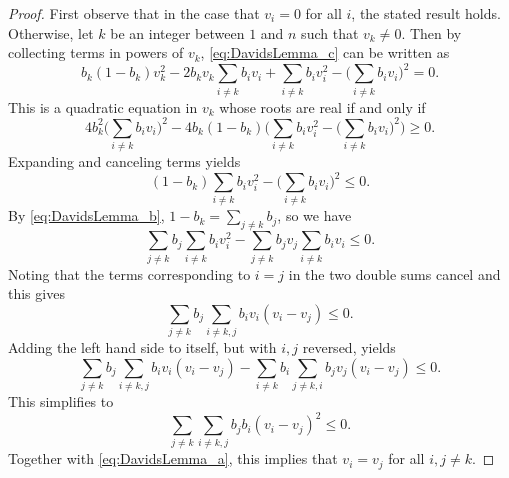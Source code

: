 \begin{proof}
    First observe that in the case that $v_i=0$ for all $i$, the stated
    result holds.  Otherwise, let $k$ be an integer between $1$ and $n$
    such that $v_k\ne 0$.
    Then by collecting terms in powers of $v_k$, \eqref{eq:DavidsLemma_c} 
    can be written as
    \begin{equation*}
    		b_k(1-b_k)v_k^2 - 2b_k v_k\sum_{i \neq k}b_i v_i + \sum_{i \neq k}b_i v_i^2 - \biggl(\sum_{i \neq k}b_i v_i\biggr)^{\!\! 2} = 0.  		
	\end{equation*}
	This is a quadratic equation in $v_k$ whose roots are real if and only if
	\begin{equation*}
    		4b_k^2\biggl(\sum_{i \neq k}b_i v_i\biggr)^{\!\! 2} - 4b_k(1-b_k)\Biggl(\sum_{i \neq k}b_i v_i^2 - \biggl(\sum_{i \neq k}b_i v_i\biggr)^{\!\! 2}\Biggr) \geq 0.
	\end{equation*}
	Expanding and canceling terms yields
	\begin{equation*}
    (1-b_k)\sum_{i \neq k}b_i v_i^2 - \biggl(\sum_{i \neq k}b_i v_i\biggr)^{\!\! 2} \leq 0.
	\end{equation*}
	By \eqref{eq:DavidsLemma_b}, $1-b_k = \sum_{j \ne k}b_j$, so we have
	\begin{equation*}
    		\sum_{j \neq k}b_j\sum_{i \neq k}b_i v_i^2 - \sum_{j \neq k}b_j v_j\sum_{i \neq k}b_i v_i \leq 0.
	\end{equation*}
	Noting that the terms corresponding to $i = j$ in the two double sums cancel and this gives
	\begin{equation*}
    		\sum_{j \neq k}b_j\sum_{i \neq k,j}b_i v_i(v_i - v_j) \leq 0.
	\end{equation*}
	Adding the left hand side to itself, but with $i, j$ reversed, yields
	\begin{equation*}
    		\sum_{j \neq k}b_j\sum_{i \neq k, j}b_i v_i(v_i - v_j) - \sum_{i \neq k}b_i\sum_{j \neq k, i}b_j v_j(v_i - v_j) \leq 0.
	\end{equation*}
	This simplifies to
	\begin{equation*}
    		\sum_{j \neq k}\sum_{i \neq k, j}b_j b_i(v_i - v_j)^2 \leq 0.
	\end{equation*}
	Together with \eqref{eq:DavidsLemma_a}, this implies that $v_i = v_j$ 
	for all $i, j \neq k$.
\end{proof}

